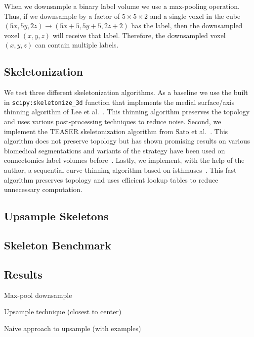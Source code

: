 When we downsample a binary label volume we use a max-pooling operation.
Thus, if we downsample by a factor of $5 \times 5 \times 2$ and a single voxel in the cube $(5x, 5y, 2z) \to (5x + 5, 5y + 5, 2z + 2)$ has the label, then the downsampled voxel $(x, y, z)$ will receive that label.
Therefore, the downsampled voxel $(x, y, z)$ can contain multiple labels.


\subsection{Skeletonization}

We test three different skeletonization algorithms.
As a baseline we use the built in \texttt{scipy:skeletonize\_3d} function that implements the medial surface/axis thinning algorithm of Lee et al.~\cite{lee1994building}.
This thinning algorithm preserves the topology and uses various post-processing techniques to reduce noise.
Second, we implement the TEASER skeletonization algorithm from Sato et al.~\cite{sato2000teasar}. 
This algorithm does not preserve topology but has shown promising results on various biomedical segmentations and variants of the strategy have been used on connectomics label volumes before~\cite{konstantin2018efficient,zhao2014automatic}.
Lastly, we implement, with the help of the author, a sequential curve-thinning algorithm based on isthmuses~\cite{palagyi2014sequential}.
This fast algorithm preserves topology and uses efficient lookup tables to reduce unnecessary computation.

\subsection{Upsample Skeletons}
\label{sec:skeleton-upsample}




\subsection{Skeleton Benchmark}




\subsection{Results}
\label{sec:skeleton-results}

Max-pool downsample

Upsample technique (closest to center)

Naive approach to upsample (with examples)

